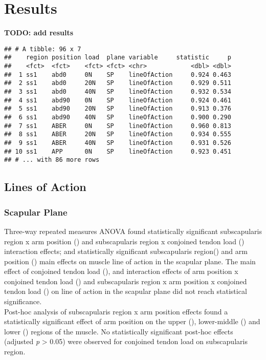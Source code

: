 \documentclass[]{elsarticle} %
\begin{document}
\hypertarget{results}{%
\section{Results}\label{results}}

\textbf{TODO: add results}

\begin{verbatim}
## # A tibble: 96 x 7
##    region position load  plane variable     statistic     p
##    <fct>  <fct>    <fct> <fct> <chr>            <dbl> <dbl>
##  1 ss1    abd0     0N    SP    lineOfAction     0.924 0.463
##  2 ss1    abd0     20N   SP    lineOfAction     0.929 0.511
##  3 ss1    abd0     40N   SP    lineOfAction     0.932 0.534
##  4 ss1    abd90    0N    SP    lineOfAction     0.924 0.461
##  5 ss1    abd90    20N   SP    lineOfAction     0.913 0.376
##  6 ss1    abd90    40N   SP    lineOfAction     0.900 0.290
##  7 ss1    ABER     0N    SP    lineOfAction     0.960 0.813
##  8 ss1    ABER     20N   SP    lineOfAction     0.934 0.555
##  9 ss1    ABER     40N   SP    lineOfAction     0.931 0.526
## 10 ss1    APP      0N    SP    lineOfAction     0.923 0.451
## # ... with 86 more rows
\end{verbatim}

\hypertarget{lines-of-action}{%
\subsection{Lines of Action}\label{lines-of-action}}

\hypertarget{scapular-plane}{%
\subsubsection{Scapular Plane}\label{scapular-plane}}

Three-way repeated measures ANOVA found statistically significant
subscapularis region x arm position () and subscapularis region x
conjoined tendon load () interaction effects; and statistically
significant subscapularis region() and arm position () main effects on
muscle line of action in the scapular plane. The main effect of
conjoined tendon load (), and interaction effects of arm position x
conjoined tendon load () and subscapularis region x arm position x
conjoined tendon load () on line of action in the scapular plane did not
reach statistical significance.\\
Post-hoc analysis of subscapularis region x arm position effects found a
statistically significant effect of arm position on the upper (),
lower-middle () and lower () regions of the muscle. No statistically
significant post-hoc effects (adjusted \emph{p} \textgreater{} 0.05)
were observed for conjoined tendon load on subscapularis region.
\end{document}
